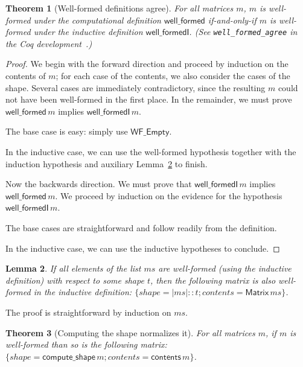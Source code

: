 \documentclass[11pt,conference]{IEEEtran}
\newcommand{\var}[1]{\mathit{#1}}
\newcommand{\func}[1]{\mathsf{#1}}
\newcommand{\iname}[1]{\textsf{#1}}
\theoremstyle{plain} %
\newtheorem{thm}{Theorem}[section]
\newtheorem{lem}[thm]{Lemma}
\theoremstyle{definition}
\theoremstyle{remark}
\begin{document}
\begin{thm}[Well-formed definitions agree]\label{Th:well_formed_agree}
    For all matrices \(m\), \(m\) is well-formed under the computational
    definition \(\func{well\_formed}\) if-and-only-if \(m\) is well-formed under
    the inductive definition \(\func{well\_formedI}\). (See
    \texttt{well\_formed\_agree} in the Coq
    development~\cite{zelda_mosaic_proof}.)
\end{thm}

\begin{proof}
    We begin with the forward direction and proceed by induction on the contents
    of \(m\); for each case of the contents, we also consider the cases of the
    shape. Several cases are immediately contradictory, since the resulting
    \(m\) could not have been well-formed in the first place. In the remainder,
    we must prove \(\func{well\_formed}\, m\) implies \(\func{well\_formedI}\,
    m\).

    The base case is easy: simply use \(\iname{WF\_Empty}\).

    In the inductive case, we can use the well-formed hypothesis together with
    the induction hypothesis and auxiliary Lemma~\ref{Lem:wfI_all_wf_t} to
    finish.

    Now the backwards direction. We must prove that \(\func{well\_formedI}\, m\)
    implies \(\func{well\_formed}\, m\). We proceed by induction on the evidence
    for the hypothesis \(\func{well\_formedI}\, m\).

    The base cases are straightforward and follow readily from the definition.

    In the inductive case, we can use the inductive hypotheses to conclude.
\end{proof}

\begin{lem}\label{Lem:wfI_all_wf_t}
    If all elements of the list \(\var{ms}\) are well-formed (using the inductive
    definition) with respect to some shape \(t\), then the following matrix is
    also well-formed in the inductive definition: \(\{ \var{shape} = |\var{ms}|
    :: t; \var{contents} = \func{Matrix}\, \var{ms} \}\).
\end{lem}

The proof is straightforward by induction on \(\var{ms}\).

\begin{thm}[Computing the shape normalizes it]\label{Th:compute_shape_wf_normalizes}
    For all matrices \(m\), if \(m\) is well-formed than so is the following
    matrix: \(\{ \var{shape} = \func{compute\_shape}\, m; \var{contents} =
    \func{contents}\, m \}\).
\end{thm}
\end{document}
